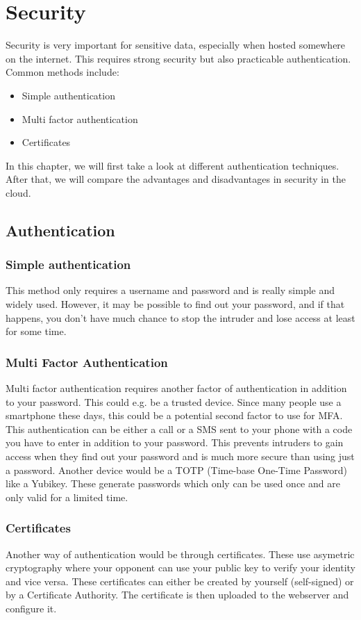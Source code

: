 \chapter{Security}
\label{chap:security}
Security is very important for sensitive data, especially when hosted somewhere on the internet.
This requires strong security but also practicable authentication. Common methods include:
\begin{itemize}
\item Simple authentication
\item Multi factor authentication
\item Certificates
\end{itemize}

In this chapter, we will first take a look at different authentication techniques. After that, we will compare the advantages and disadvantages in security in the cloud.

\section{Authentication}

\subsection{Simple authentication}
This method only requires a username and password and is really simple and widely used. However, it may be possible to find out your password, and if that happens, you don't have much chance to stop the intruder and lose access at least for some time.

\subsection{Multi Factor Authentication}
Multi factor authentication requires another factor of authentication in addition to your password. This could e.g. be a trusted device. Since many people use a smartphone these days, this could be a potential second factor to use for MFA.
This authentication can be either a call or a SMS sent to your phone with a code you have to enter in addition to your password. This prevents intruders to gain access when they find out your password and is much more secure than using just a password. 
Another device would be a TOTP (Time-base One-Time Password) like a Yubikey. These generate passwords which only can be used once and are only valid for a limited time. 
\cite{cloud_acc}

\subsection{Certificates}
Another way of authentication would be through certificates. These use asymetric cryptography where your opponent can use your public key to verify your identity and vice versa. These certificates can either be created by yourself (self-signed) or by a Certificate Authority. The certificate is then uploaded to the webserver and configure it.

